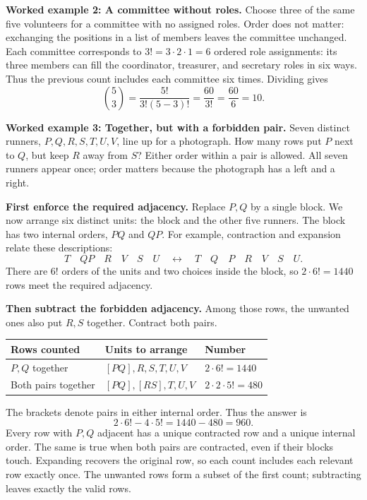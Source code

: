 \documentclass[11pt]{article}
\begin{document}
\textbf{Worked example 2: A committee without roles.}
Choose three of the same five volunteers for a committee with no assigned
roles. Order does not matter: exchanging the positions in a list of
members leaves the committee unchanged. Each committee corresponds to
$3!=3\cdot2\cdot1=6$ ordered role assignments: its three members can
fill the coordinator, treasurer, and secretary roles in six ways.
Thus the previous count includes each committee six times. Dividing gives
\[
\binom{5}{3}=\frac{5!}{3!(5-3)!}=\frac{60}{3!}
=\frac{60}{6}=\boxed{10}.
\]


\textbf{Worked example 3: Together, but with a forbidden pair.}
Seven distinct runners, $P,Q,R,S,T,U,V$, line up for a photograph.
How many rows put $P$ next to $Q$, but keep $R$ away from $S$?
Either order within a pair is allowed. All seven runners appear once;
order matters because the photograph has a left and a right.

\textbf{First enforce the required adjacency.} Replace $P,Q$ by a
single block. We now arrange six distinct units: the block and the other
five runners. The block has two internal orders, $PQ$ and $QP$.
For example, contraction and expansion relate these descriptions:
\[
T\quad\boxed{QP}\quad R\quad V\quad S\quad U
\quad\longleftrightarrow\quad
T\quad Q\quad P\quad R\quad V\quad S\quad U.
\]
There are $6!$ orders of the units and two choices inside the block,
so $2\cdot6!=1440$ rows meet the required adjacency.

\textbf{Then subtract the forbidden adjacency.} Among those rows,
the unwanted ones also put $R,S$ together. Contract both pairs.
\begin{center}
\begin{tabular}{@{}lll@{}}
\toprule
Rows counted & Units to arrange & Number \\
\midrule
$P,Q$ together & $[PQ],R,S,T,U,V$ & $2\cdot6!=1440$ \\
Both pairs together & $[PQ],[RS],T,U,V$ & $2\cdot2\cdot5!=480$ \\
\bottomrule
\end{tabular}
\end{center}
The brackets denote pairs in either internal order. Thus the answer is
\[
2\cdot6!-4\cdot5!=1440-480=\boxed{960}.
\]
Every row with $P,Q$ adjacent has a unique contracted row and a unique
internal order. The same is true when both pairs are contracted, even
if their blocks touch. Expanding recovers the original row, so each
count includes each relevant row exactly once. The unwanted rows form
a subset of the first count; subtracting leaves exactly the valid rows.
\end{document}
